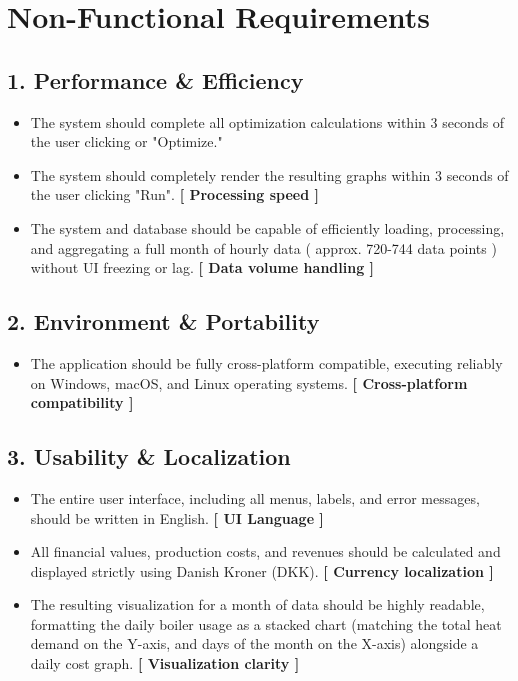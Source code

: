 \section{Non-Functional Requirements}

\subsection*{1. Performance \& Efficiency}
\begin{itemize}
    \item The system should complete all optimization calculations within 3 seconds of the user clicking or "Optimize."
    \item The system should completely render the resulting graphs within 3 seconds of the user clicking "Run". \textbf{[ Processing speed ]}
    \item The system and database should be capable of efficiently loading, processing, and aggregating a full month of hourly data ( approx. 720-744 data points ) without UI freezing or lag. \textbf{[ Data volume handling ]}
\end{itemize}

\subsection*{2. Environment \& Portability}
\begin{itemize}
    \item The application should be fully cross-platform compatible, executing reliably on Windows, macOS, and Linux operating systems. \textbf{[ Cross-platform compatibility ]}
\end{itemize}

\subsection*{3. Usability \& Localization}
\begin{itemize}
    \item The entire user interface, including all menus, labels, and error messages, should be written in English. \textbf{[ UI Language ]}
    \item All financial values, production costs, and revenues should be calculated and displayed strictly using Danish Kroner (DKK). \textbf{[ Currency localization ]}
    \item The resulting visualization for a month of data should be highly readable, formatting the daily boiler usage as a stacked chart (matching the total heat demand on the Y-axis, and days of the month on the X-axis) alongside a daily cost graph. \textbf{[ Visualization clarity ]}
\end{itemize}

